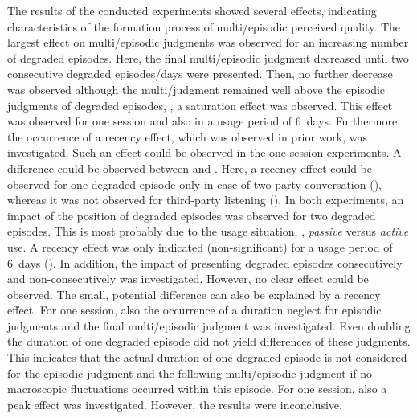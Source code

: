 The results of the conducted experiments showed several effects, indicating characteristics of the formation process of multi\-/episodic perceived quality.
The largest effect on multi\-/episodic judgments was observed for an increasing number of degraded episodes.
Here, the final multi\-/episodic judgment decreased until two consecutive degraded episodes/days were presented.
Then, no further decrease was observed although the multi\-/judgment remained well above the episodic judgments of degraded episodes, \ie, a saturation effect was observed.
This effect was observed for one session and also in a usage period of 6~days.
Furthermore, the occurrence of a recency effect, which was observed in prior work, was investigated.
Such an effect could be observed in the one-session experiments.
A difference could be observed between  and \EIIa{}.
Here, a recency effect could be observed for one degraded episode only in case of two-party conversation (), whereas it was not observed for third-party listening (\EIIa{}).
In both experiments, an impact of the position of degraded episodes was observed for two degraded episodes.
This is most probably due to the usage situation, \ie, \emph{passive} versus \emph{active} use.
A recency effect was only indicated (non-significant) for a usage period of 6~days ().
In addition, the impact of presenting degraded episodes consecutively and non-consecutively was investigated.
However, no clear effect could be observed.
The small, potential difference can also be explained by a recency effect.
For one session, also the occurrence of a duration neglect for episodic judgments and the final multi\-/episodic judgment was investigated.
Even doubling the duration of one degraded episode did not yield differences of these judgments.
This indicates that the actual duration of one degraded episode is not considered for the episodic judgment and the following multi\-/episodic judgment if no macroscopic fluctuations occurred within this episode.
For one session, also a peak effect was investigated.
However, the results were inconclusive.

